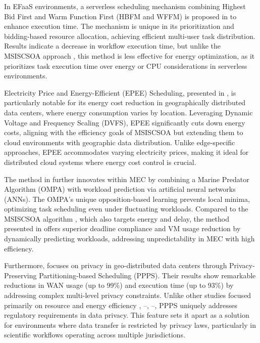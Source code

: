 \documentclass[a4paper, final]{article}
\begin{document}
In EFaaS environments, a serverless scheduling mechanism combining Highest Bid First and Warm Function 
First (HBFM and WFFM) is proposed in \cite{bib:4_faas} to enhance execution time. The mechanism is unique 
in its prioritization and bidding-based resource allocation, achieving efficient multi-user task distribution. 
Results indicate a decrease in workflow execution time, but unlike the MSISCSOA approach \cite{bib:3_sandcat}, 
this method is less effective for energy optimization, as it prioritizes task execution time over energy or 
CPU considerations in serverless environments.

Electricity Price and Energy-Efficient (EPEE) Scheduling, presented in \cite{bib:5_epee}, is particularly 
notable for its energy cost reduction in geographically distributed data centers, where energy consumption 
varies by location. Leveraging Dynamic Voltage and Frequency Scaling (DVFS), EPEE significantly cuts down
energy costs, aligning with the efficiency goals of MSISCSOA \cite{bib:3_sandcat} but extending them to cloud 
environments with geographic data distribution. Unlike edge-specific approaches, EPEE accommodates varying 
electricity prices, making it ideal for distributed cloud systems where energy cost control is crucial.

The method in \cite{bib:6_marine} further innovates within MEC by combining a Marine Predator Algorithm 
(OMPA) with workload prediction via artificial neural networks (ANNs). The OMPA’s unique opposition-based 
learning prevents local minima, optimizing task scheduling even under fluctuating workloads. Compared to the 
MSISCSOA algorithm \cite{bib:3_sandcat}, which also targets energy and delay, the method presented in 
\cite{bib:6_marine} offers superior deadline compliance and VM usage reduction by dynamically predicting 
workloads, addressing unpredictability in MEC with high efficiency.

Furthermore, \cite{bib:7_ppps} focuses on privacy in geo-distributed data centers through Privacy-Preserving 
Partitioning-based Scheduling (PPPS). Their results show remarkable reductions in WAN usage (up to 99\%) 
and execution time (up to 93\%) by addressing complex multi-level privacy constraints. Unlike other studies 
focused primarily on resource and energy efficiency \cite{bib:1_acrl}, 
\cite{bib:3_sandcat}--\cite{bib:6_marine}, \cite{bib:8}--\cite{bib:10}, PPPS uniquely addresses regulatory 
requirements in data privacy. This feature sets it apart as a solution for environments where data transfer 
is restricted by privacy laws, particularly in scientific workflows operating across multiple jurisdictions.
\end{document}
